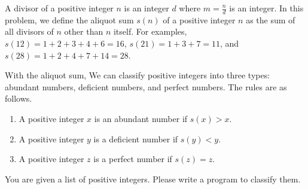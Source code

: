 A divisor of a positive integer $n$ is an integer $d$ where $m=\frac{n}{d}$ 
is an integer. 
In this problem, we define the aliquot sum $s(n)$ of a positive integer $n$ 
as the sum of all divisors of $n$ other than $n$ itself. 
For examples, $s(12)=1+2+3+4+6=16$, $s(21)=1+3+7=11$, and $s(28)=1+2+4+7+14=28$.

With the aliquot sum, We can classify positive integers into three types: 
abundant numbers, deficient numbers, and perfect numbers.
The rules are as follows.
\begin{enumerate}
\item A positive integer $x$ is an abundant number if $s(x)>x$.
\item A positive integer $y$ is a deficient number if $s(y)<y$.
\item A positive integer $z$ is a perfect number if $s(z)=z$.
\end{enumerate}

You are given a list of positive integers. 
Please write a program to classify them.
